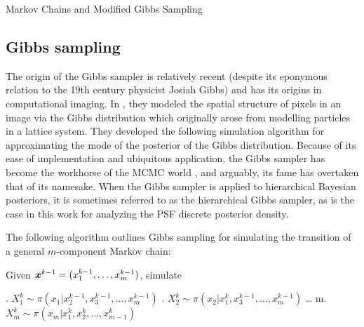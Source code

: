 \begin{chapter}{Markov Chains and Modified Gibbs Sampling}
\subsection{Gibbs sampling}

The origin of the Gibbs sampler is relatively recent (despite its eponymous relation to the 19th century physicist Josiah Gibbs) and has its origins in computational imaging. 
In \citep{geman1984stochastic}, they modeled the spatial structure of pixels in an image via the Gibbs distribution which originally arose from modelling particles in a lattice system.
They developed the following simulation algorithm for approximating the mode of the posterior of the Gibbs distribution.
Because of its ease of implementation and ubiquitous application, the Gibbs sampler has become the workhorse of the MCMC world \citep{robert2013monte}, and arguably, its fame has overtaken that of its namesake.
When the Gibbs sampler is applied to hierarchical Bayesian posteriors, it is sometimes referred to as the hierarchical Gibbs sampler, as is the case in this work for analyzing the PSF discrete posterior density.

The following algorithm outlines Gibbs sampling for simulating the transition of a general $m$-component Markov chain:
\begin{algorithm}
\caption{Gibbs sampler} \label{alg:gibbs}
  Given $\mbox{\boldmath$x$}^{k-1} = (x_1^{k-1},\dots,x_m^{k-1})$, simulate
\begin{algorithmic}[0]
  . $X_1^{k} \sim \pi(x_1|x_2^{k-1},x_3^{k-1},\dots,x_m^{k-1})$
  . $X_2^{k} \sim \pi(x_2|x_1^k,x_3^{k-1},\dots,x_m^{k-1})$ 
  \STATE \dots
  \STATE m. $X_m^{k} \sim \pi(x_m|x_1^k,x_2^{k},\dots,x_{m-1}^{k})$
\end{algorithmic}
\end{algorithm}


\end{chapter}
